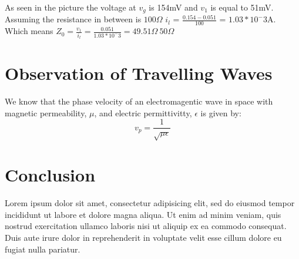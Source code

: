 \documentclass[10pt]{article}
\begin{document}
As seen in the picture the voltage at $v_g$ is 154mV and $v_1$ is equal to 51mV. Assuming the resistance in between is $100\Omega$ 
 $i_l$ = $\frac{0.154-0.051}{100}$ = $1.03*10^-3$A. Which means $Z_0=\frac{v_1}{i_l}=\frac{0.051}{1.03*10^-3}=49.51\Omega~50\Omega $


\section{Observation of Travelling Waves}

We know that the phase velocity of an electromagentic wave in space with magnetic permeability, $\mu$,
and electric permittivitty, $\epsilon$  is given by:
$$v_p = \frac{1}{\sqrt{\mu \epsilon}}$$



\section{Conclusion}

Lorem ipsum dolor sit amet, consectetur adipisicing elit, sed do eiusmod tempor
incididunt ut labore et dolore magna aliqua. Ut enim ad minim veniam, quis
nostrud exercitation ullamco laboris nisi ut aliquip ex ea commodo consequat.
Duis aute irure dolor in reprehenderit in voluptate velit esse cillum dolore eu
fugiat nulla pariatur.
\end{document}
